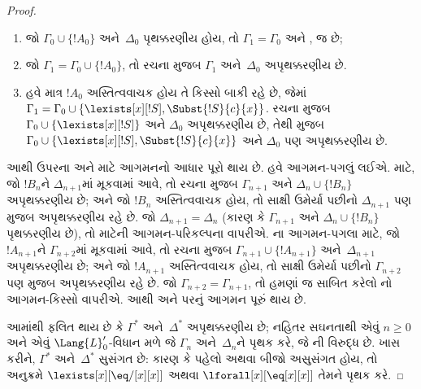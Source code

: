 \documentclass[../../../include/open-logic-section]{subfiles}
\begin{document}
\begin{proof}
\begin{enumerate}
\item જો $\Gamma_0 \cup \{!A_0 \}$ અને~$\Delta_0$ પૃથક્કરણીય હોય,
  તો $\Gamma_1=\Gamma_0$ અને ,  જ છે;
\item જો $\Gamma_1 = \Gamma_0 \cup\{!A_0\}$, તો રચના મુજબ
  $\Gamma_1$ અને~$\Delta_0$ અપૃથક્કરણીય છે.
\item હવે માત્ર $!A_0$ અસ્તિત્વવાચક હોય તે કિસ્સો બાકી રહે છે, જેમાં
  $\Gamma_1 = \Gamma_0 \cup \{ \lexists[x][!S], \Subst{!S}{c}{x}
  \}$. રચના મુજબ $\Gamma_0 \cup \{ \lexists[x][!S]\}$ અને
  $\Delta_0$ અપૃથક્કરણીય છે, તેથી  મુજબ
  $\Gamma_0 \cup \{ \lexists[x][!S], \Subst{!S}{c}{x} \}$ અને
  $\Delta_0$ પણ અપૃથક્કરણીય છે.
\end{enumerate}
આથી ઉપરના  અને  માટે આગમનનો આધાર પૂરો
થાય છે. હવે આગમન-પગલું લઈએ.  માટે, જો $!B_n$ને
$\Delta_{n+1}$માં મૂકવામાં આવે, તો રચના મુજબ $\Gamma_{n+1}$ અને
$\Delta_n\cup\{!B_n\}$ અપૃથક્કરણીય છે; અને જો $!B_n$ અસ્તિત્વવાચક
હોય, તો સાક્ષી ઉમેર્યા પછીનો $\Delta_{n+1}$ પણ
 મુજબ અપૃથક્કરણીય રહે છે. જો
$\Delta_{n+1}=\Delta_n$ (કારણ કે $\Gamma_{n+1}$ અને
$\Delta_n\cup\{!B_n\}$ પૃથક્કરણીય છે), તો  માટેની
આગમન-પરિકલ્પના વાપરીએ. ના આગમન-પગલા માટે, જો
$!A_{n+1}$ને $\Gamma_{n+2}$માં મૂકવામાં આવે, તો રચના મુજબ
$\Gamma_{n+1}\cup\{!A_{n+1}\}$ અને~$\Delta_{n+1}$ અપૃથક્કરણીય છે;
અને જો $!A_{n+1}$ અસ્તિત્વવાચક હોય, તો સાક્ષી ઉમેર્યા પછીનો
$\Gamma_{n+2}$ પણ  મુજબ અપૃથક્કરણીય રહે છે. જો
$\Gamma_{n+2}=\Gamma_{n+1}$, તો હમણાં જ સાબિત કરેલો
નો આગમન-કિસ્સો વાપરીએ. આથી  અને
 પરનું આગમન પૂરું થાય છે.

આમાંથી ફલિત થાય છે કે $\Gamma^*$ અને~$\Delta^*$ અપૃથક્કરણીય છે;
નહિતર સઘનતાથી એવું $n\ge0$ અને એવું $\Lang{L}'_0$-વિધાન મળે જે
$\Gamma_n$ અને~$\Delta_n$ને પૃથક કરે, જે ની વિરુદ્ધ
છે. ખાસ કરીને, $\Gamma^*$ અને~$\Delta^*$ સુસંગત છે: કારણ કે પહેલો
અથવા બીજો અસુસંગત હોય, તો અનુક્રમે $\lexists[x][\eq/[x][x]]$ અથવા
$\lforall[x][\eq[x][x]]$ તેમને પૃથક કરે.


\end{proof}
\end{document}
